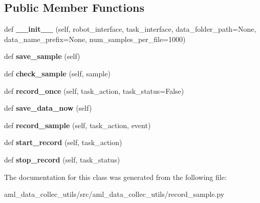 \subsection*{Public Member Functions}
\begin{DoxyCompactItemize}
\item 
\hypertarget{classaml__data__collec__utils_1_1record__sample_1_1_record_sample_ac94205a086eee2ae1c7e344750d968b4}{}\label{classaml__data__collec__utils_1_1record__sample_1_1_record_sample_ac94205a086eee2ae1c7e344750d968b4} 
def {\bfseries \+\_\+\+\_\+init\+\_\+\+\_\+} (self, robot\+\_\+interface, task\+\_\+interface, data\+\_\+folder\+\_\+path=None, data\+\_\+name\+\_\+prefix=None, num\+\_\+samples\+\_\+per\+\_\+file=1000)
\item 
\hypertarget{classaml__data__collec__utils_1_1record__sample_1_1_record_sample_a2cf5030d6a436a3224cfdeee860932ca}{}\label{classaml__data__collec__utils_1_1record__sample_1_1_record_sample_a2cf5030d6a436a3224cfdeee860932ca} 
def {\bfseries save\+\_\+sample} (self)
\item 
\hypertarget{classaml__data__collec__utils_1_1record__sample_1_1_record_sample_a676378ad2f3687b2a09d508c1f913d15}{}\label{classaml__data__collec__utils_1_1record__sample_1_1_record_sample_a676378ad2f3687b2a09d508c1f913d15} 
def {\bfseries check\+\_\+sample} (self, sample)
\item 
\hypertarget{classaml__data__collec__utils_1_1record__sample_1_1_record_sample_a5afa9d8ed0860709a1ab3a0cedb4d526}{}\label{classaml__data__collec__utils_1_1record__sample_1_1_record_sample_a5afa9d8ed0860709a1ab3a0cedb4d526} 
def {\bfseries record\+\_\+once} (self, task\+\_\+action, task\+\_\+status=False)
\item 
\hypertarget{classaml__data__collec__utils_1_1record__sample_1_1_record_sample_a3f31051f77b0d970a0fd8a28cd60d568}{}\label{classaml__data__collec__utils_1_1record__sample_1_1_record_sample_a3f31051f77b0d970a0fd8a28cd60d568} 
def {\bfseries save\+\_\+data\+\_\+now} (self)
\item 
\hypertarget{classaml__data__collec__utils_1_1record__sample_1_1_record_sample_aa1f9255e78265164401e71ae9ba5cf5b}{}\label{classaml__data__collec__utils_1_1record__sample_1_1_record_sample_aa1f9255e78265164401e71ae9ba5cf5b} 
def {\bfseries record\+\_\+sample} (self, task\+\_\+action, event)
\item 
\hypertarget{classaml__data__collec__utils_1_1record__sample_1_1_record_sample_afe4fad165a722e2ea45ce4c3c09f7fb1}{}\label{classaml__data__collec__utils_1_1record__sample_1_1_record_sample_afe4fad165a722e2ea45ce4c3c09f7fb1} 
def {\bfseries start\+\_\+record} (self, task\+\_\+action)
\item 
\hypertarget{classaml__data__collec__utils_1_1record__sample_1_1_record_sample_a025d36cc765fc24721d3a3f2876aa832}{}\label{classaml__data__collec__utils_1_1record__sample_1_1_record_sample_a025d36cc765fc24721d3a3f2876aa832} 
def {\bfseries stop\+\_\+record} (self, task\+\_\+status)
\end{DoxyCompactItemize}


The documentation for this class was generated from the following file\+:\begin{DoxyCompactItemize}
\item 
aml\+\_\+data\+\_\+collec\+\_\+utils/src/aml\+\_\+data\+\_\+collec\+\_\+utils/record\+\_\+sample.\+py\end{DoxyCompactItemize}

